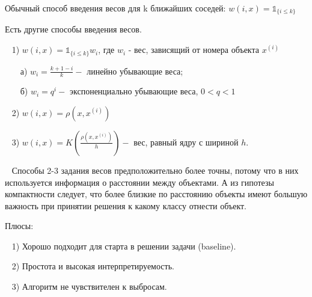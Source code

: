 \documentclass[a4paper,titlepage]{article}
\begin{document}
Обычный способ введения весов для k ближайших соседей: $w(i, x) = \mathds{1}_{\{i \leqslant k\}}$
\newpage




Есть другие способы введения весов.

\par ~ 1) $w(i, x) = \mathds{1}_{\{i \leqslant k\}} w_i$,  где $w_i$ - вес, зависящий от номера объекта $x^{(i)}$

\par ~~~ а) $w_i = \frac{k + 1 - i}{k} -$ линейно убывающие веса;

\par ~~~ б) $w_i = q^i -$ экспоненциально убывающие веса, $0 < q < 1$

\par ~ 2) $w(i, x) = \rho(x, x^{(i)})$

\par ~ 3) $w(i, x) = K\left(\frac{\rho(x, x^{(i)})}{h}\right)-$ вес, равный ядру с шириной $h$.

\par ~ Способы 2-3 задания весов предположительно более точны, потому что в них используется информация о расстоянии между объектами. А из гипотезы компактности следует, что более близкие по расстоянию объекты имеют большую важность при принятии решения к какому классу отнести объект. 




Плюсы:

\par ~ 1) Хорошо подходит для старта в решении задачи (baseline).

\par ~ 2) Простота и высокая интерпретируемость.

\par ~ 3) Алгоритм не чувствителен к выбросам.
\end{document}
